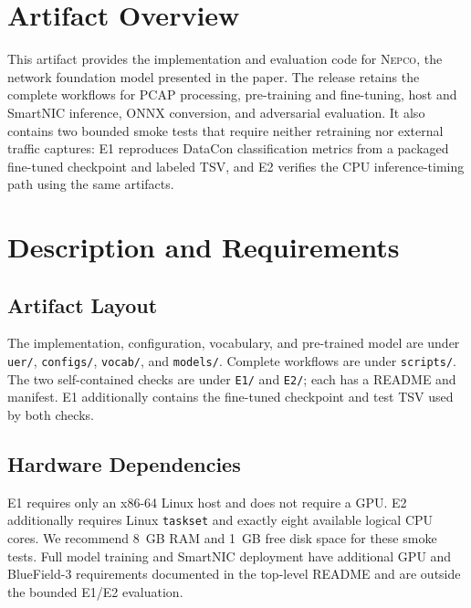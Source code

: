 \documentclass[10pt,letterpaper,twocolumn]{article}
\begin{document}

\section{Artifact Overview}
This artifact provides the implementation and evaluation code for \textsc{Nepco}, the network foundation model presented in the paper. The release retains the complete workflows for PCAP processing, pre-training and fine-tuning, host and SmartNIC inference, ONNX conversion, and adversarial evaluation. It also contains two bounded smoke tests that require neither retraining nor external traffic captures: E1 reproduces DataCon classification metrics from a packaged fine-tuned checkpoint and labeled TSV, and E2 verifies the CPU inference-timing path using the same artifacts.

\section{Description and Requirements}
\subsection{Artifact Layout}
The implementation, configuration, vocabulary, and pre-trained model are under \texttt{uer/}, \texttt{configs/}, \texttt{vocab/}, and \texttt{models/}. Complete workflows are under \texttt{scripts/}. The two self-contained checks are under \texttt{E1/} and \texttt{E2/}; each has a README and manifest. E1 additionally contains the fine-tuned checkpoint and test TSV used by both checks.

\subsection{Hardware Dependencies}
E1 requires only an x86-64 Linux host and does not require a GPU. E2 additionally requires Linux \texttt{taskset} and exactly eight available logical CPU cores. We recommend 8~GB RAM and 1~GB free disk space for these smoke tests. Full model training and SmartNIC deployment have additional GPU and BlueField-3 requirements documented in the top-level README and are outside the bounded E1/E2 evaluation.
\end{document}
